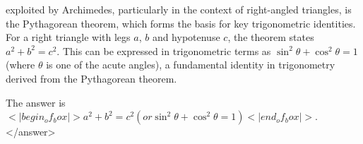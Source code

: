 exploited by Archimedes, particularly in the context of right-angled triangles, is the Pythagorean theorem, which forms the basis for key trigonometric identities. For a right triangle with legs \(a\), \(b\) and hypotenuse \(c\), the theorem states \(a^2 + b^2 = c^2\). This can be expressed in trigonometric terms as \(\sin^2\theta + \cos^2\theta = 1\) (where \(\theta\) is one of the acute angles), a fundamental identity in trigonometry derived from the Pythagorean theorem.  

The answer is \(<|begin_of_box|>a^2 + b^2 = c^2 (or \sin^2\theta + \cos^2\theta = 1)<|end_of_box|>\).</answer>